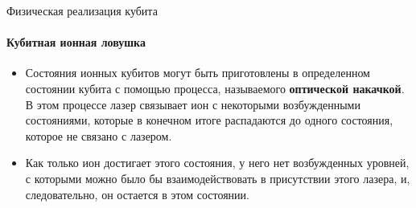 \documentclass{beamer}
\begin{document}
    \begin{frame}{Физическая реализация кубита}
    \framesubtitle{Кубитная ионная ловушка}

    \begin{itemize}
            \item <1-> Состояния ионных кубитов могут быть приготовлены в определенном состоянии кубита с помощью процесса, называемого \textbf{оптической накачкой}. В этом процессе лазер связывает ион с некоторыми возбужденными состояниями, которые в конечном итоге распадаются до одного состояния, которое не связано с лазером.
            \item <2-> Как только ион достигает этого состояния, у него нет возбужденных уровней, с которыми можно было бы взаимодействовать в присутствии этого лазера, и, следовательно, он остается в этом состоянии.
    \end{itemize}


    \end{frame}
\end{document}
